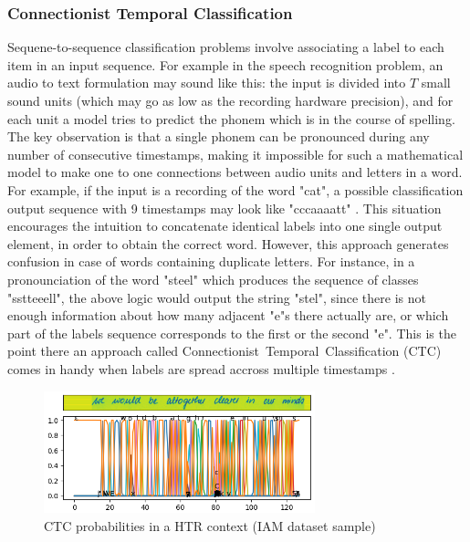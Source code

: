 \subsubsection{Connectionist Temporal Classification}
\label{subsec:ch3sec3subsec4subsubsec4}

Sequene-to-sequence classification problems involve associating a label to each item in an input sequence. For example in the speech recognition problem, an audio to text formulation may sound like this: the input is divided into $T$ small sound units (which may go as low as the recording hardware precision), and for each unit a model tries to predict the phonem which is in the course of spelling. The key observation is that a single phonem can be pronounced during any number of consecutive timestamps, making it impossible for such a mathematical model to make one to one connections between audio units and letters in a word. For example, if the input is a recording of the word "cat", a possible classification output sequence with 9 timestamps may look like "cccaaaatt" \cite{ctc_loss_explained}. This situation encourages the intuition to concatenate identical labels into one single output element, in order to obtain the correct word. However, this approach generates confusion in case of words containing duplicate letters. For instance, in a pronounciation of the word "steel" which produces the sequence of classes "sstteeell", the above logic would output the string "stel", since there is not enough information about how many adjacent "e"s there actually are, or which part of the labels sequence corresponds to the first or the second "e". This is the point there an approach called \mbox{Connectionist Temporal Classification} (CTC) comes in handy when labels are spread accross multiple timestamps \cite{ctc}. 

\begin{figure}[htbp]
    \centering
        \includegraphics[width=0.7\textwidth]{figures/ctc_on_htr.png}
    \caption{CTC probabilities in a HTR context (IAM dataset sample)}
    \label{FigCTC}
\end{figure}

